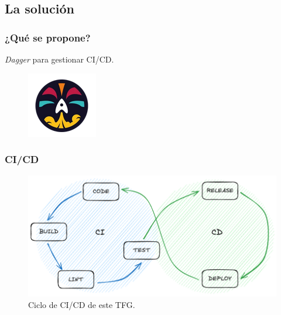 \documentclass{beamer}
\begin{document}
\subsection{La solución}

\begin{frame}
    \frametitle{¿Qué se propone?}
    \begin{center}
        {\it Dagger} para gestionar CI/CD.
    \end{center}
    \begin{figure}
        \includegraphics[scale=1.2]{figuras/Dagger_logo}
    \end{figure}
\end{frame}

\begin{frame}
    \frametitle{CI/CD}
    \begin{figure}
        \includegraphics[scale=0.35]{figuras/ci_cd}
        \caption{Ciclo de CI/CD de este TFG.}
    \end{figure}
\end{frame}
\end{document}
